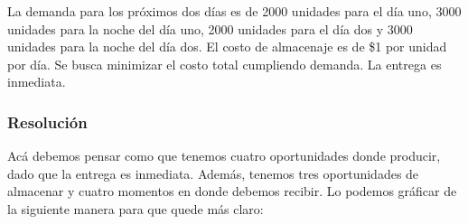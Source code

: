 \documentclass[12pt]{article}
\begin{document}
La demanda para los próximos dos días es de 2000 unidades para el día uno, 3000 unidades para la noche del día uno, 2000 unidades para el día dos y 3000 unidades para la noche del día dos. El costo de almacenaje es de \$1 por unidad por día. Se busca minimizar el costo total cumpliendo demanda. La entrega es inmediata.

\subsubsection{Resolución}

Acá debemos pensar como que tenemos cuatro oportunidades donde producir, dado que la entrega es inmediata. Además, tenemos tres oportunidades de almacenar y cuatro momentos en donde debemos recibir. Lo podemos gráficar de la siguiente manera para que quede más claro:
\end{document}
